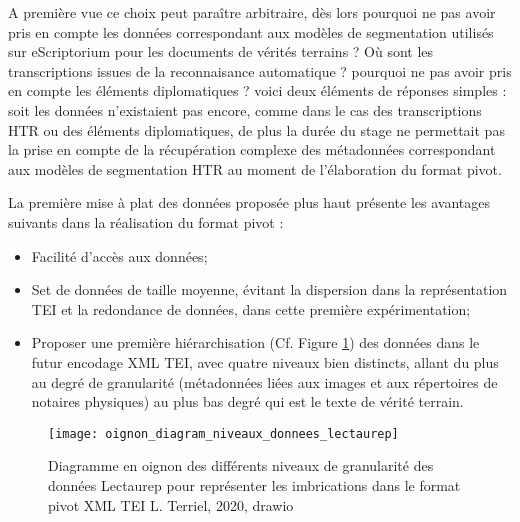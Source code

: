 A première vue ce choix peut paraître arbitraire, dès lors pourquoi ne pas avoir pris en compte les données correspondant aux modèles de segmentation utilisés sur eScriptorium pour les documents de vérités terrains ? Où sont les transcriptions issues de la reconnaisance automatique ? pourquoi ne pas avoir pris en compte les éléments diplomatiques ? voici deux éléments de réponses simples : soit les  données n'existaient pas encore, comme dans le cas des transcriptions HTR ou des éléments diplomatiques, de plus la durée du stage ne permettait pas la prise en compte de la récupération complexe des métadonnées correspondant aux modèles de segmentation HTR au moment de l'élaboration du format pivot. 

La première mise à plat des données proposée plus haut présente les avantages suivants dans la réalisation du format pivot : 
\begin{itemize}
    \item Facilité d'accès aux données;
    \item Set de données de taille moyenne, évitant la dispersion dans la représentation TEI et la redondance de données, dans cette première expérimentation;
    \item Proposer une première hiérarchisation (Cf. Figure \ref{fig:oignon_diagram_niveaux_donnees_lectaurep}) des données dans le futur encodage XML TEI, avec quatre niveaux bien distincts, allant du plus au degré de granularité (métadonnées liées aux images et aux répertoires de notaires physiques) au plus bas degré qui est le texte de vérité terrain.
\end{itemize}

\bigskip

\begin{center}
\begin{figure}[h]
    \centering
    \centerline{\texttt{[image: oignon\_diagram\_niveaux\_donnees\_lectaurep]}}
    \caption{Diagramme en oignon des différents niveaux de granularité des données Lectaurep pour représenter les imbrications dans le format pivot XML TEI \textcopyright L. Terriel, 2020, drawio}
    \label{fig:oignon_diagram_niveaux_donnees_lectaurep}
\end{figure}
\end{center}

